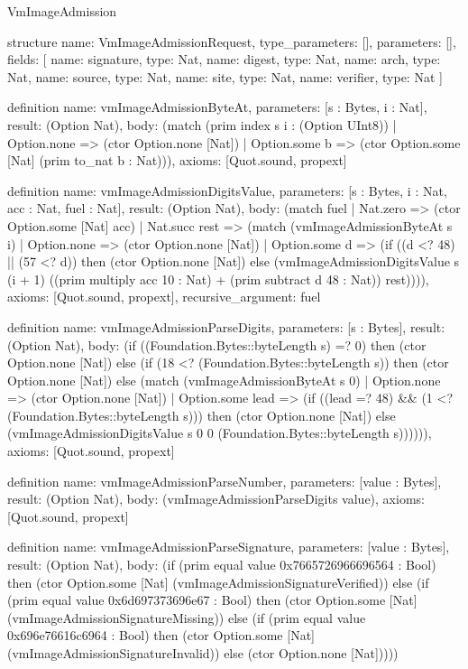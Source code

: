 \begin{lexlean}{VmImageAdmission}
\begin{semanticmodule}
structure{
  name: VmImageAdmissionRequest,
  type_parameters: [],
  parameters: [],
  fields: [
    {name: signature, type: Nat},
    {name: digest, type: Nat},
    {name: arch, type: Nat},
    {name: source, type: Nat},
    {name: site, type: Nat},
    {name: verifier, type: Nat}
  ]
}

definition{
  name: vmImageAdmissionByteAt,
  parameters: [s : Bytes, i : Nat],
  result: (Option Nat),
  body: (match (prim index s i : (Option UInt8))
    | Option.none => (ctor Option.none [Nat])
    | Option.some b => (ctor Option.some [Nat] (prim to_nat b : Nat))),
  axioms: [Quot.sound, propext]
}

definition{
  name: vmImageAdmissionDigitsValue,
  parameters: [s : Bytes, i : Nat, acc : Nat, fuel : Nat],
  result: (Option Nat),
  body: (match fuel
    | Nat.zero => (ctor Option.some [Nat] acc)
    | Nat.succ rest => (match (vmImageAdmissionByteAt s i)
      | Option.none => (ctor Option.none [Nat])
      | Option.some d => (if ((d <? 48) || (57 <? d)) then (ctor Option.none [Nat]) else (vmImageAdmissionDigitsValue s (i + 1) ((prim multiply acc 10 : Nat) + (prim subtract d 48 : Nat)) rest)))),
  axioms: [Quot.sound, propext],
  recursive_argument: fuel
}

definition{
  name: vmImageAdmissionParseDigits,
  parameters: [s : Bytes],
  result: (Option Nat),
  body: (if ((Foundation.Bytes::byteLength s) =? 0) then (ctor Option.none [Nat]) else (if (18 <? (Foundation.Bytes::byteLength s)) then (ctor Option.none [Nat]) else (match (vmImageAdmissionByteAt s 0)
    | Option.none => (ctor Option.none [Nat])
    | Option.some lead => (if ((lead =? 48) && (1 <? (Foundation.Bytes::byteLength s))) then (ctor Option.none [Nat]) else (vmImageAdmissionDigitsValue s 0 0 (Foundation.Bytes::byteLength s)))))),
  axioms: [Quot.sound, propext]
}

definition{
  name: vmImageAdmissionParseNumber,
  parameters: [value : Bytes],
  result: (Option Nat),
  body: (vmImageAdmissionParseDigits value),
  axioms: [Quot.sound, propext]
}

definition{
  name: vmImageAdmissionParseSignature,
  parameters: [value : Bytes],
  result: (Option Nat),
  body: (if (prim equal value 0x7665726966696564 : Bool) then (ctor Option.some [Nat] (vmImageAdmissionSignatureVerified)) else (if (prim equal value 0x6d697373696e67 : Bool) then (ctor Option.some [Nat] (vmImageAdmissionSignatureMissing)) else (if (prim equal value 0x696e76616c6964 : Bool) then (ctor Option.some [Nat] (vmImageAdmissionSignatureInvalid)) else (ctor Option.none [Nat]))))
}


\end{semanticmodule}
\end{lexlean}
